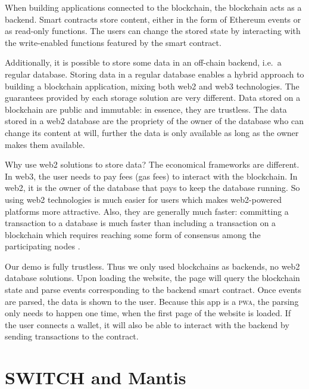 When building applications connected to the blockchain, the blockchain acts as a backend.
Smart contracts store content, either in the form of Ethereum events or as read-only functions.
The users can change the stored state by interacting with the write-enabled functions featured by the smart contract.

Additionally, it is possible to store some data in an off-chain backend, i.e.\ a regular database.
Storing data in a regular database enables a hybrid approach to building a blockchain application, mixing both web2 and web3 technologies.
The guarantees provided by each storage solution are very different.
Data stored on a blockchain are public and immutable: in essence, they are trustless.
The data stored in a web2 database are the propriety of the owner of the database who can change its content at will, further the data is only available as long as the owner makes them available.

Why use web2 solutions to store data?
The economical frameworks are different.
In web3, the user needs to pay fees (gas fees) to interact with the blockchain.
In web2, it is the owner of the database that pays to keep the database running.
So using web2 technologies is much easier for users which makes web2-powered platforms more attractive.
Also, they are generally much faster: committing a transaction to a database is much faster than including a transaction on a blockchain which requires reaching some form of consensus among the participating nodes%
.

Our demo is fully trustless.
Thus we only used blockchains as backends, no web2 database solutions.
Upon loading the website, the page will query the blockchain state and parse events corresponding to the backend smart contract.
Once events are parsed, the data is shown to the user.
Because this app is a \textsc{pwa}, the parsing only needs to happen one time, when the first page of the website is loaded.
If the user connects a wallet, it will also be able to interact with the backend by sending transactions to the contract.

\section{SWITCH and Mantis}

